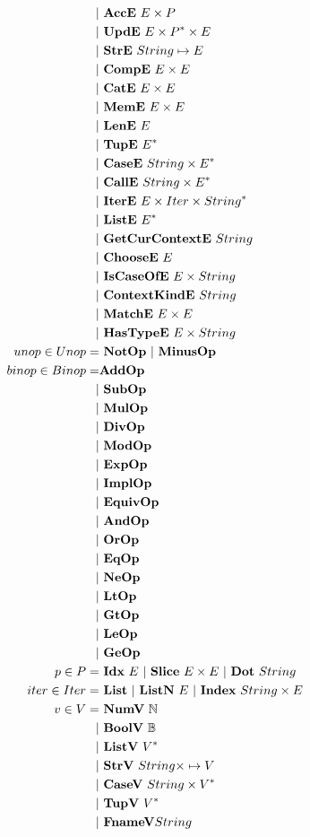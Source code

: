 \begin{align*}
    | & ~ \textbf{AccE} ~ E \times P \\
    | & ~ \textbf{UpdE} ~ E \times P^* \times E \\
    | & ~ \textbf{StrE} ~ String \mapsto E \\
    | & ~ \textbf{CompE} ~ E \times E \\
    | & ~ \textbf{CatE} ~ E \times E \\
    | & ~ \textbf{MemE} ~ E \times E \\
    | & ~ \textbf{LenE} ~ E \\
    | & ~ \textbf{TupE} ~ E^* \\
    | & ~ \textbf{CaseE} ~ String \times E^* \\
    | & ~ \textbf{CallE} ~ String \times E^* \\
    | & ~ \textbf{IterE} ~ E \times Iter \times String^* \\
    | & ~ \textbf{ListE} ~ E^* \\
    | & ~ \textbf{GetCurContextE} ~ String \\
    | & ~ \textbf{ChooseE} ~ E \\
    | & ~ \textbf{IsCaseOfE} ~ E \times String \\
    | & ~ \textbf{ContextKindE} ~ String \\
    | & ~ \textbf{MatchE} ~ E \times E \\
    | & ~ \textbf{HasTypeE} ~ E \times String \\
  unop \in Unop =& ~ \textbf{NotOp} ~ | ~ \textbf{MinusOp} \\
  binop \in Binop =& \textbf{AddOp} \\
    | & ~ \textbf{SubOp} \\
    | & ~ \textbf{MulOp} \\
    | & ~ \textbf{DivOp} \\
    | & ~ \textbf{ModOp} \\
    | & ~ \textbf{ExpOp} \\
    | & ~ \textbf{ImplOp} \\
    | & ~ \textbf{EquivOp} \\
    | & ~ \textbf{AndOp} \\
    | & ~ \textbf{OrOp} \\
    | & ~ \textbf{EqOp} \\
    | & ~ \textbf{NeOp} \\
    | & ~ \textbf{LtOp} \\
    | & ~ \textbf{GtOp} \\
    | & ~ \textbf{LeOp} \\
    | & ~ \textbf{GeOp} \\
  p \in P =& ~ \textbf{Idx} ~ E ~ | ~ \textbf{Slice} ~ E \times E ~ | ~ \textbf{Dot} ~ String \\
  iter \in Iter =& ~ \textbf{List} ~ | ~ \textbf{ListN} ~ E ~|~ \textbf{Index} ~ String \times E \\
  v \in V =& ~ \textbf{NumV} ~ \mathbb N \\
    | & ~ \textbf{BoolV} ~ \mathbb B \\
    | & ~ \textbf{ListV} ~ V^* \\
    | & ~ \textbf{StrV} ~ String \times \mapsto V \\
    | & ~ \textbf{CaseV} ~ String \times V^* \\
    | & ~ \textbf{TupV} ~ V^* \\
    | & ~ \textbf{FnameV} String \\
\end{align*}



